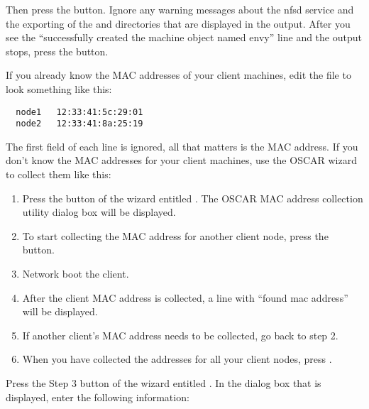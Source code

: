 Then press the  button. Ignore any warning
messages about the nfsd service and the exporting of the 
and  directories that are displayed in the output.
After you see the ``successfully created the machine object named envy''
line and the output stops, press the  button.


If you already know the MAC addresses of your client machines, edit
the file  to look something like this:

\begin{verbatim}
  node1   12:33:41:5c:29:01
  node2   12:33:41:8a:25:19
\end{verbatim}

The first field of each line is ignored, all that matters is the MAC address.
If you don't know the MAC addresses for your client machines, use the
OSCAR wizard to collect them like this:

\begin{enumerate}
\item Press the button of the wizard entitled 
  . The OSCAR MAC address collection
  utility dialog box will be displayed.
\item To start collecting the MAC address for another client node, 
  press the  button.
\item Network boot the client.
\item After the client MAC address is collected, a line with 
  ``found mac address'' will be displayed.
\item If another client's MAC address needs to be collected,
  go back to step 2.
\item When you have collected the
  addresses for all your client nodes, press .
\end{enumerate}


Press the Step 3 button of the wizard entitled . In the dialog box that is displayed, enter the
  following information:

